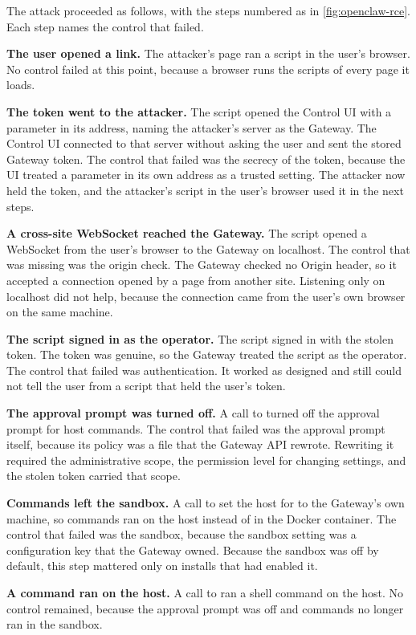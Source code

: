 The attack proceeded as follows, with the steps numbered as in \cref{fig:openclaw-rce}. Each step
names the control that failed.
\be
\item \textbf{The user opened a link.} The attacker's page ran a script in the user's browser. No
control failed at this point, because a browser runs the scripts of every page it loads.
\item \textbf{The token went to the attacker.} The script opened the Control UI with a
 parameter in its address, naming the attacker's server as the Gateway. The
Control UI connected to that server without asking the user and sent the stored Gateway token. The
control that failed was the secrecy of the token, because the UI treated a parameter in its own
address as a trusted setting. The attacker now held the token, and the attacker's script in the
user's browser used it in the next steps.
\item \textbf{A cross-site WebSocket reached the Gateway.} The script opened a WebSocket from the
user's browser to the Gateway on localhost. The control that was missing was the origin check. The
Gateway checked no Origin header, so it accepted a connection opened by a page from another site.
Listening only on localhost did not help, because the connection came from the user's own browser
on the same machine.
\item \textbf{The script signed in as the operator.} The script signed in with the stolen token. The
token was genuine, so the Gateway treated the script as the operator. The control that failed was
authentication. It worked as designed and still could not tell the user from a script that held the
user's token.
\item \textbf{The approval prompt was turned off.} A call to  turned off
the approval prompt for host commands. The control that failed was the approval prompt itself,
because its policy was a file that the Gateway API rewrote. Rewriting it required the administrative
scope, the permission level for changing settings, and the stolen token carried that scope.
\item \textbf{Commands left the sandbox.} A call to  set the host for
 to the Gateway's own machine, so commands ran on the host instead of in the Docker
container. The control that failed was the sandbox, because the sandbox setting was a configuration
key that the Gateway owned. Because the sandbox was off by default, this step mattered only on
installs that had enabled it.
\item \textbf{A command ran on the host.} A call to  ran a shell command on the
host. No control remained, because the approval prompt was off and commands no longer ran in the
sandbox.
\ee

